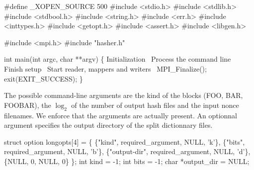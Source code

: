 \documentclass{article}%
\begin{document}
\nwenddocs{}\endmoddef\nwstartdeflinemarkup{}\nwenddeflinemarkup
#define _XOPEN_SOURCE 500
#include <stdio.h>
#include <stdlib.h>
#include <stdbool.h>
#include <string.h>
#include <err.h>
#include <inttypes.h>
#include <getopt.h>
#include <assert.h>
#include <libgen.h>

#include <mpi.h>
#include "hasher.h"


\nwendcode{}\endmoddef\nwstartdeflinemarkup{}\nwenddeflinemarkup
int main(int argc, char **argv)
\{
        \LA{}Initialization~{\nwtagstyle{}}\RA{}
        \LA{}Process the command line~{\nwtagstyle{}}\RA{}
        \LA{}Finish setup~{\nwtagstyle{}}\RA{}
        \LA{}Start reader, mappers and writers~{\nwtagstyle{}}\RA{}
        MPI_Finalize();
        exit(EXIT_SUCCESS);
\}

\nwendcode{}The possible command-line arguments are the kind of the blocks  ({\Tt{}FOO\nwendquote},
{\Tt{}BAR\nwendquote}, {\Tt{}FOOBAR\nwendquote}), the $\log_2$ of the number of output hash files and the
input nonce filenames. We enforce that the arguments are actually present. An
optionnal argument specifies the output directory of the split dictionnary
files.

\nwenddocs{}\endmoddef\nwstartdeflinemarkup{}\nwenddeflinemarkup
struct option longopts[4] = \{
        \{"kind", required_argument, NULL, 'k'\},
        \{"bits", required_argument, NULL, 'b'\},
        \{"output-dir", required_argument, NULL, 'd'\},
        \{NULL, 0, NULL, 0\}
\};
int kind = -1;
int bits = -1;
char *output_dir = NULL;
\end{document}
